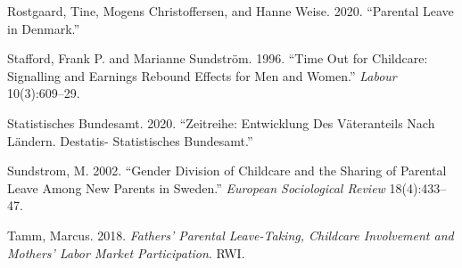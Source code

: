 \documentclass[
  12pt,
]{article}
\begin{document}
\leavevmode\hypertarget{ref-rostgaard_parental_2020}{}%
Rostgaard, Tine, Mogens Christoffersen, and Hanne Weise. 2020. ``Parental Leave in Denmark.''

\leavevmode\hypertarget{ref-stafford_time_1996}{}%
Stafford, Frank P. and Marianne Sundström. 1996. ``Time Out for Childcare: Signalling and Earnings Rebound Effects for Men and Women.'' \emph{Labour} 10(3):609--29.

\leavevmode\hypertarget{ref-statistisches_bundesamt_zeitreihe_2020}{}%
Statistisches Bundesamt. 2020. ``Zeitreihe: Entwicklung Des Väteranteils Nach Ländern. Destatis- Statistisches Bundesamt.''

\leavevmode\hypertarget{ref-sundstrom_gender_2002}{}%
Sundstrom, M. 2002. ``Gender Division of Childcare and the Sharing of Parental Leave Among New Parents in Sweden.'' \emph{European Sociological Review} 18(4):433--47.

\leavevmode\hypertarget{ref-tamm_fathers_2018}{}%
Tamm, Marcus. 2018. \emph{Fathers' Parental Leave-Taking, Childcare Involvement and Mothers' Labor Market Participation}. RWI.
\end{document}
